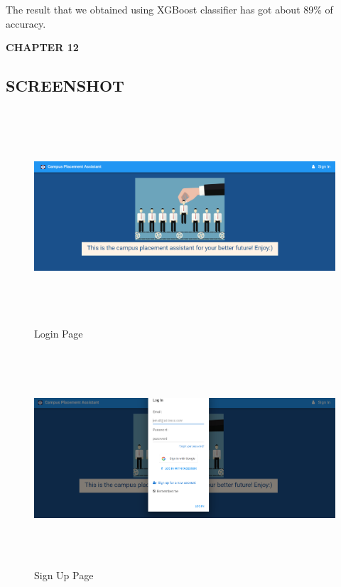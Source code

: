 \documentclass[12pt]{article}
\begin{document}
The result that we obtained using XGBoost classifier has got about 89\% of accuracy.
\newpage
\begin{flushleft}\textbf{CHAPTER 12} \end{flushleft}
\begin{flushleft}\section{SCREENSHOT} \end{flushleft}

\begin{figure}[H]
\begin{center}
 \includegraphics[width=16cm, height=8cm]{Screenshot1}
\caption{Login Page }
\end{center}
\end{figure}

\begin{figure}[H]
\begin{center}
 \includegraphics[width=16cm, height=8cm]{Screenshot2}
\caption{Sign Up Page}
\end{center}
\end{figure}
\end{document}
